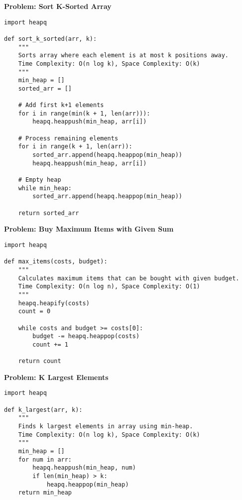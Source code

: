 \noindent\textbf{Problem: Sort K-Sorted Array}
\begin{verbatim}
import heapq

def sort_k_sorted(arr, k):
    """
    Sorts array where each element is at most k positions away.
    Time Complexity: O(n log k), Space Complexity: O(k)
    """
    min_heap = []
    sorted_arr = []
    
    # Add first k+1 elements
    for i in range(min(k + 1, len(arr))):
        heapq.heappush(min_heap, arr[i])
    
    # Process remaining elements
    for i in range(k + 1, len(arr)):
        sorted_arr.append(heapq.heappop(min_heap))
        heapq.heappush(min_heap, arr[i])
    
    # Empty heap
    while min_heap:
        sorted_arr.append(heapq.heappop(min_heap))
    
    return sorted_arr
\end{verbatim}

\noindent\textbf{Problem: Buy Maximum Items with Given Sum}
\begin{verbatim}
import heapq

def max_items(costs, budget):
    """
    Calculates maximum items that can be bought with given budget.
    Time Complexity: O(n log n), Space Complexity: O(1)
    """
    heapq.heapify(costs)
    count = 0
    
    while costs and budget >= costs[0]:
        budget -= heapq.heappop(costs)
        count += 1
    
    return count
\end{verbatim}

\noindent\textbf{Problem: K Largest Elements}
\begin{verbatim}
import heapq

def k_largest(arr, k):
    """
    Finds k largest elements in array using min-heap.
    Time Complexity: O(n log k), Space Complexity: O(k)
    """
    min_heap = []
    for num in arr:
        heapq.heappush(min_heap, num)
        if len(min_heap) > k:
            heapq.heappop(min_heap)
    return min_heap
\end{verbatim}


